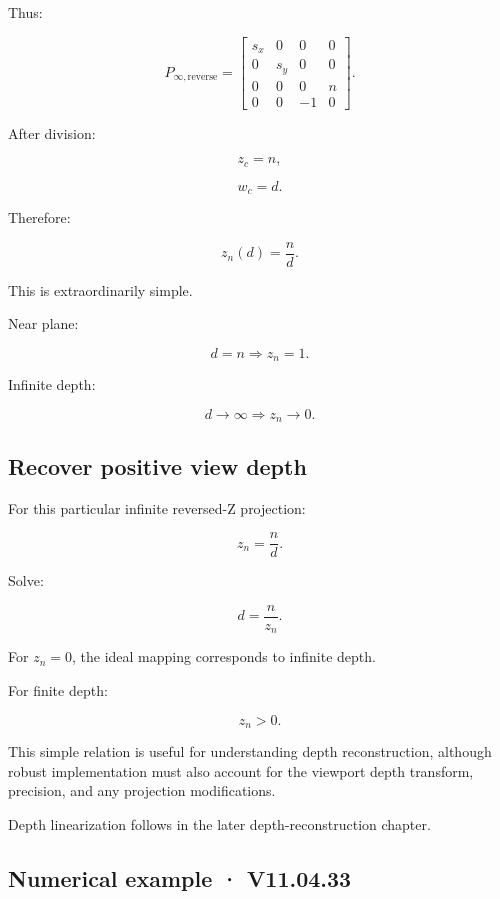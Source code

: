 Thus:

\[
 \boxed{ P_{\infty,\mathrm{reverse}}= \begin{bmatrix} s_x&0&0&0\\ 0&s_y&0&0\\ 0&0&0&n\\ 0&0&-1&0 \end{bmatrix} }.
\]

After division:

\[
 z_c=n,
\]

\[
 w_c=d.
\]

Therefore:

\[
 \boxed{ z_n(d)=\frac nd }.
\]

This is extraordinarily simple.

Near plane:

\[
 d=n\Rightarrow z_n=1.
\]

Infinite depth:

\[
 d\to\infty\Rightarrow z_n\to0.
\]

\subsection{Recover positive view depth}\label{02-foundations-ii-ch033-recover-positive-view-depth}

\hypertarget{02-foundations-ii-ch033-recover-positive-view-depth}{}

For this particular infinite reversed-Z projection:

\[
 z_n=\frac nd.
\]

Solve:

\[
 \boxed{ d=\frac n{z_n} }.
\]

For \(z_n=0\), the ideal mapping corresponds to infinite depth.

For finite depth:

\[
 z_n>0.
\]

This simple relation is useful for understanding depth reconstruction, although robust implementation must also account for the viewport depth transform, precision, and any projection modifications.

Depth linearization follows in the later depth-reconstruction chapter.

\subsection{Numerical example · V11.04.33}\label{02-foundations-ii-ch033-numerical-example-v11.04.33}

\hypertarget{02-foundations-ii-ch033-numerical-example-v11.04.33}{}

